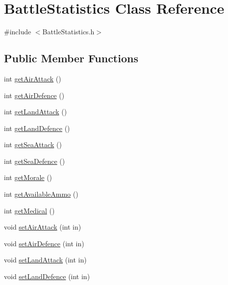 \hypertarget{class_battle_statistics}{}\section{Battle\+Statistics Class Reference}
\label{class_battle_statistics}


{\ttfamily \#include $<$Battle\+Statistics.\+h$>$}

\subsection*{Public Member Functions}
\begin{DoxyCompactItemize}
\item 
int \mbox{\hyperlink{class_battle_statistics_a2394b50005d68f9bb1ab1534a3d28412}{get\+Air\+Attack}} ()
\item 
int \mbox{\hyperlink{class_battle_statistics_a53c3392b80588c4af5758b2c880a3c1b}{get\+Air\+Defence}} ()
\item 
int \mbox{\hyperlink{class_battle_statistics_afbc695f7a7004fad65494bb5959f4de8}{get\+Land\+Attack}} ()
\item 
int \mbox{\hyperlink{class_battle_statistics_add238d645102680c952341c7b3eb4231}{get\+Land\+Defence}} ()
\item 
int \mbox{\hyperlink{class_battle_statistics_aa5a5835dfe7a429bc6c5e2db0899282d}{get\+Sea\+Attack}} ()
\item 
int \mbox{\hyperlink{class_battle_statistics_ac94fc63847c35abcbf0771eb62bba60a}{get\+Sea\+Defence}} ()
\item 
int \mbox{\hyperlink{class_battle_statistics_a41fafd234d8805ac18d120103a134b63}{get\+Morale}} ()
\item 
int \mbox{\hyperlink{class_battle_statistics_abd94f14d0b22780bfa8ca32863eb09c6}{get\+Available\+Ammo}} ()
\item 
int \mbox{\hyperlink{class_battle_statistics_ad13c6afaa148ab21f60d6a90b368119c}{get\+Medical}} ()
\item 
void \mbox{\hyperlink{class_battle_statistics_acff054a1f8efac14ee3ef79d5ebc6f0f}{set\+Air\+Attack}} (int in)
\item 
void \mbox{\hyperlink{class_battle_statistics_a239957ecf36ff638300af491051e08cd}{set\+Air\+Defence}} (int in)
\item 
void \mbox{\hyperlink{class_battle_statistics_aa87f6b43ead2d3f7d143465a7c127b16}{set\+Land\+Attack}} (int in)
\item 
void \mbox{\hyperlink{class_battle_statistics_ab0f56ad463807fad79d1bedd82a790a6}{set\+Land\+Defence}} (int in)

\end{DoxyCompactItemize}
